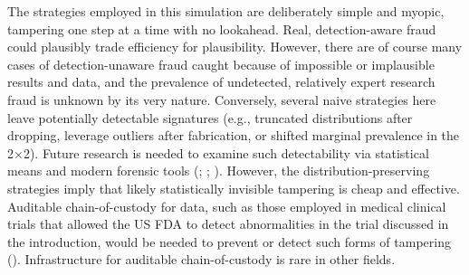\documentclass[
  nonatbib,
  authoryear,
  preprint]{elsarticle}
\begin{document}
The strategies employed in this simulation are deliberately simple and
myopic, tampering one step at a time with no lookahead. Real,
detection-aware fraud could plausibly trade efficiency for plausibility.
However, there are of course many cases of detection-unaware fraud
caught because of impossible or implausible results and data, and the
prevalence of undetected, relatively expert research fraud is unknown by
its very nature. Conversely, several naive strategies here leave
potentially detectable signatures (e.g., truncated distributions after
dropping, leverage outliers after fabrication, or shifted marginal
prevalence in the 2×2). Future research is needed to examine such
detectability via statistical means and modern forensic tools
(;
;
).
However, the distribution-preserving strategies imply that likely
statistically invisible tampering is cheap and effective. Auditable
chain-of-custody for data, such as those employed in medical clinical
trials that allowed the US FDA to detect abnormalities in the trial
discussed in the introduction, would be needed to prevent or detect such
forms of tampering
(). Infrastructure for auditable chain-of-custody is rare in other
fields.
\end{document}
